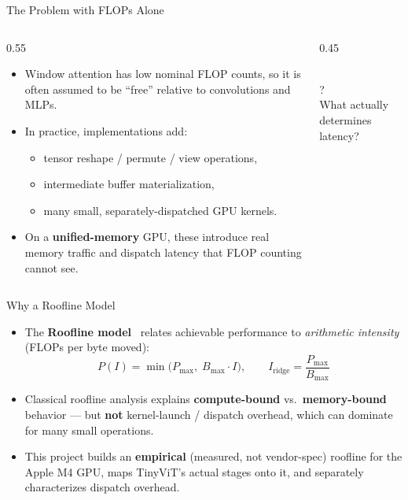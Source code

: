 \documentclass[aspectratio=169]{beamer}
\begin{document}
\begin{frame}{The Problem with FLOPs Alone}
  \begin{columns}[T]
    \begin{column}{0.55\textwidth}
      \begin{itemize}
        \item Window attention has low nominal FLOP counts, so it is often assumed to be
          ``free'' relative to convolutions and MLPs.
        \item In practice, implementations add:
        \begin{itemize}
          \item tensor reshape / permute / view operations,
          \item intermediate buffer materialization,
          \item many small, separately-dispatched GPU kernels.
        \end{itemize}
        \item On a \textbf{unified-memory} GPU, these introduce real memory traffic and
          dispatch latency that FLOP counting cannot see.
      \end{itemize}
    \end{column}
    \begin{column}{0.45\textwidth}
      \centering
      \\[2mm]
      {\small \Large ?} \\[1mm]
      {\small What actually determines latency?}
    \end{column}
  \end{columns}
\end{frame}

\begin{frame}{Why a Roofline Model}
  \begin{itemize}
    \item The \textbf{Roofline model}~\cite{williams2009roofline} relates achievable performance
      to \emph{arithmetic intensity} (FLOPs per byte moved):
    \[
      P(I) = \min\bigl(P_{\max},\; B_{\max} \cdot I\bigr), \qquad
      I_{\text{ridge}} = \frac{P_{\max}}{B_{\max}}
    \]
    \item Classical roofline analysis explains \textbf{compute-bound} vs.\ \textbf{memory-bound}
      behavior --- but \textbf{not} kernel-launch / dispatch overhead, which can dominate for
      many small operations.
    \item This project builds an \textbf{empirical} (measured, not vendor-spec) roofline for the
      Apple M4 GPU, maps TinyViT's actual stages onto it, and separately characterizes dispatch
      overhead.
  \end{itemize}
\end{frame}
\end{document}
